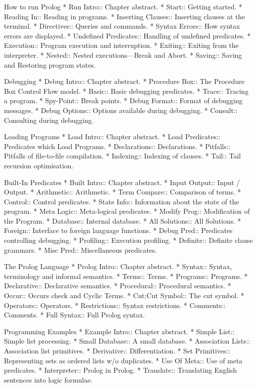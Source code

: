 How to run Prolog
* Run Intro::	Chapter abstract.
* Start::	Getting started.
* Reading In::	Reading in programs.
* Inserting Clauses:: Inserting clauses at the terminal.
* Directives::  Queries and commands.
* Syntax Errors:: How syntax errors are displayed.
* Undefined Predicates:: Handling of undefined predicates.
* Execution::	Program execution and interruption.
* Exiting::	Exiting from the interpreter.
* Nested::	Nested executions---Break and Abort.
* Saving::	Saving and Restoring program states.

Debugging
* Debug Intro::	Chapter abstract.
* Procedure Box:: The Procedure Box Control Flow model.
* Basic::	Basic debugging predicates.
* Trace::	Tracing a program.
* Spy-Point::	Break points.
* Debug Format:: Format of debugging messages.
* Debug Options:: Options available during debugging.
* Consult::	Consulting during debugging.

Loading Programs
* Load Intro::  Chapter abstract.
* Load Predicates:: Predicates which Load Programs.
* Declarations:: Declarations.
* Pitfalls:: 	Pitfalls of file-to-file compilation.
* Indexing::	Indexing of clauses.
* Tail::	Tail recursion optimisation.

Built-In Predicates
* Built Intro::	Chapter abstract.
* Input Output:: Input / Output.
* Arithmetic::	Arithmetic.
* Term Compare:: Comparison of terms.
* Control::	Control predicates.
* State Info::	Information about the state of the program.
* Meta Logic::  Meta-logical predicates.
* Modify Prog:: Modification of the Program.
* Database::	Internal database.
* All Solutions::	All Solutions.
* Foreign::	Interface to foreign language functions.
* Debug Pred::	Predicates controlling debugging.
* Profiling::	Execution profiling.
* Definite::	Definite clause grammars.
* Misc Pred::	Miscellaneous predicates.

The Prolog Language
* Prolog Intro:: Chapter abstract.
* Syntax::	Syntax, terminology and informal semantics.
* Terms::	Terms.
* Programs::	Programs.
* Declarative:: Declarative semantics.
* Procedural::  Procedural semantics.
* Occur::	Occurs check and Cyclic Terms.
* Cut:Cut Symbol:: The cut symbol.
* Operators::	Operators.
* Restrictions:: Syntax restrictions.
* Comments::	Comments.
* Full Syntax:: Full Prolog syntax.

Programming Examples
* Example Intro:: Chapter abstract.
* Simple List::	Simple list processing.
* Small Database:: A small database.
* Association Lists::	Association list primitives.
* Derivative::	Differentiation.
* Set Primitives::	Representing sets as ordered lists w/o duplicates.
* Use Of Meta:: Use of meta predicates.
* Interpreter:: Prolog in Prolog.
* Translate::	Translating English sentences into logic formulae.

